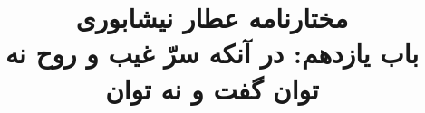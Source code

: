 \documentclass[14pt,b5paper]{article}
\begin{document}
\title{\Huge مختارنامه عطار نیشابوری \\
باب یازدهم: در آنکه سرّ غیب و روح نه توان گفت و نه توان}
\author{ }
\date{ }
\maketitle
\newpage
\tableofcontents
\newpage

\newpage

\newpage

\newpage

\newpage

\newpage

\newpage

\newpage

\newpage

\newpage

\newpage

\newpage

\newpage

\newpage

\newpage

\newpage

\newpage

\newpage

\newpage

\newpage

\newpage

\newpage

\newpage

\newpage

\newpage

\newpage

\newpage

\newpage

\newpage

\newpage

\newpage

\newpage

\newpage

\newpage

\newpage

\newpage

\newpage

\newpage

\newpage

\newpage

\newpage

\newpage

\newpage

\newpage

\newpage

\newpage

\newpage

\newpage

\newpage

\newpage

\newpage

\newpage

\newpage
\end{document}
